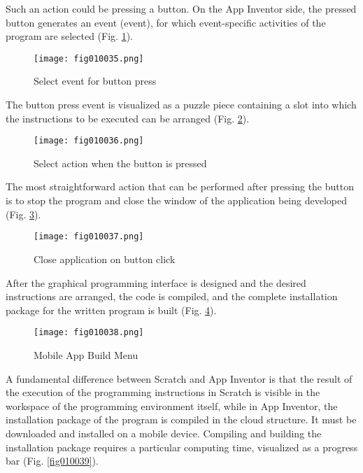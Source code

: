 Such an action could be pressing a button. On the App Inventor side, the pressed button generates an event (event), for which event-specific activities of the program are selected (Fig. \ref{fig010035}).

\begin{figure}[H]
   \centering
   \texttt{[image: fig010035.png]}
   \caption{Select event for button press}
\label{fig010035}
\end{figure}

The button press event is visualized as a puzzle piece containing a slot into which the instructions to be executed can be arranged (Fig. \ref{fig010036}).

\begin{figure}[H]
   \centering
   \texttt{[image: fig010036.png]}
   \caption{Select action when the button is pressed}
\label{fig010036}
\end{figure}

The most straightforward action that can be performed after pressing the button is to stop the program and close the window of the application being developed (Fig. \ref{fig010037}).

\begin{figure}[H]
   \centering
   \texttt{[image: fig010037.png]}
   \caption{Close application on button click}
\label{fig010037}
\end{figure}

After the graphical programming interface is designed and the desired instructions are arranged, the code is compiled, and the complete installation package for the written program is built (Fig. \ref{fig010038}).

\begin{figure}[H]
   \centering
   \texttt{[image: fig010038.png]}
   \caption{Mobile App Build Menu}
\label{fig010038}
\end{figure}

A fundamental difference between Scratch and App Inventor is that the result of the execution of the programming instructions in Scratch is visible in the workspace of the programming environment itself, while in App Inventor, the installation package of the program is compiled in the cloud structure. It must be downloaded and installed on a mobile device. Compiling and building the installation package requires a particular computing time, visualized as a progress bar (Fig. \ref{fig010039}).

